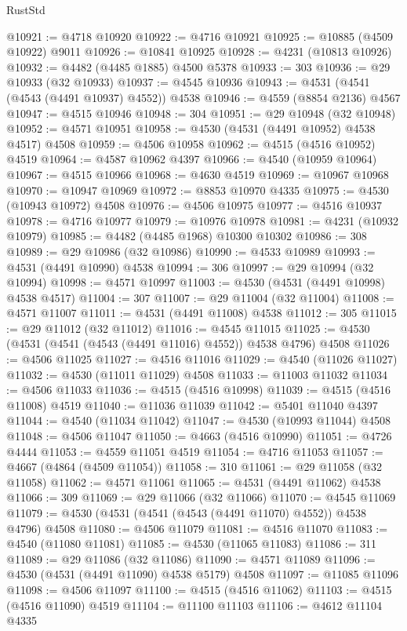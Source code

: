\begin{lexlean}{RustStd}
\begin{coremodule}
@10921 := @4718 @10920
@10922 := @4716 @10921
@10925 := @10885 (@4509 @10922) @9011
@10926 := @10841 @10925
@10928 := @4231 (@10813 @10926)
@10932 := @4482 (@4485 @1885) @4500 @5378
@10933 := 303
@10936 := @29 @10933 (@32 @10933)
@10937 := @4545 @10936
@10943 := @4531 (@4541 (@4543 (@4491 @10937) @4552)) @4538
@10946 := @4559 (@8854 @2136) @4567
@10947 := @4515 @10946
@10948 := 304
@10951 := @29 @10948 (@32 @10948)
@10952 := @4571 @10951
@10958 := @4530 (@4531 (@4491 @10952) @4538 @4517) @4508
@10959 := @4506 @10958
@10962 := @4515 (@4516 @10952) @4519
@10964 := @4587 @10962 @4397
@10966 := @4540 (@10959 @10964)
@10967 := @4515 @10966
@10968 := @4630 @4519
@10969 := @10967 @10968
@10970 := @10947 @10969
@10972 := @8853 @10970 @4335
@10975 := @4530 (@10943 @10972) @4508
@10976 := @4506 @10975
@10977 := @4516 @10937
@10978 := @4716 @10977
@10979 := @10976 @10978
@10981 := @4231 (@10932 @10979)
@10985 := @4482 (@4485 @1968) @10300 @10302
@10986 := 308
@10989 := @29 @10986 (@32 @10986)
@10990 := @4533 @10989
@10993 := @4531 (@4491 @10990) @4538
@10994 := 306
@10997 := @29 @10994 (@32 @10994)
@10998 := @4571 @10997
@11003 := @4530 (@4531 (@4491 @10998) @4538 @4517)
@11004 := 307
@11007 := @29 @11004 (@32 @11004)
@11008 := @4571 @11007
@11011 := @4531 (@4491 @11008) @4538
@11012 := 305
@11015 := @29 @11012 (@32 @11012)
@11016 := @4545 @11015
@11025 := @4530 (@4531 (@4541 (@4543 (@4491 @11016) @4552)) @4538 @4796) @4508
@11026 := @4506 @11025
@11027 := @4516 @11016
@11029 := @4540 (@11026 @11027)
@11032 := @4530 (@11011 @11029) @4508
@11033 := @11003 @11032
@11034 := @4506 @11033
@11036 := @4515 (@4516 @10998)
@11039 := @4515 (@4516 @11008) @4519
@11040 := @11036 @11039
@11042 := @5401 @11040 @4397
@11044 := @4540 (@11034 @11042)
@11047 := @4530 (@10993 @11044) @4508
@11048 := @4506 @11047
@11050 := @4663 (@4516 @10990)
@11051 := @4726 @4444
@11053 := @4559 @11051 @4519
@11054 := @4716 @11053
@11057 := @4667 (@4864 (@4509 @11054))
@11058 := 310
@11061 := @29 @11058 (@32 @11058)
@11062 := @4571 @11061
@11065 := @4531 (@4491 @11062) @4538
@11066 := 309
@11069 := @29 @11066 (@32 @11066)
@11070 := @4545 @11069
@11079 := @4530 (@4531 (@4541 (@4543 (@4491 @11070) @4552)) @4538 @4796) @4508
@11080 := @4506 @11079
@11081 := @4516 @11070
@11083 := @4540 (@11080 @11081)
@11085 := @4530 (@11065 @11083)
@11086 := 311
@11089 := @29 @11086 (@32 @11086)
@11090 := @4571 @11089
@11096 := @4530 (@4531 (@4491 @11090) @4538 @5179) @4508
@11097 := @11085 @11096
@11098 := @4506 @11097
@11100 := @4515 (@4516 @11062)
@11103 := @4515 (@4516 @11090) @4519
@11104 := @11100 @11103
@11106 := @4612 @11104 @4335

\end{coremodule}
\end{lexlean}
